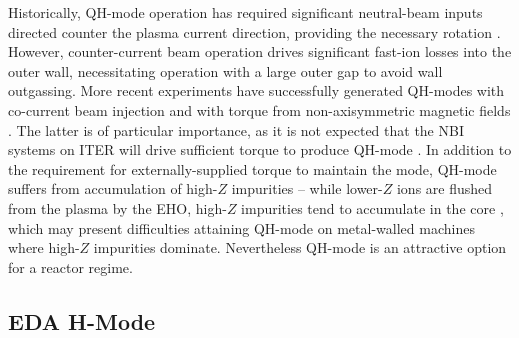 Historically, QH-mode operation has required significant neutral-beam inputs directed counter the plasma current direction, providing the necessary rotation \cite{Burrell2002}.  However, counter-current beam operation drives significant fast-ion losses into the outer wall, necessitating operation with a large outer gap to avoid wall outgassing.  More recent experiments have successfully generated QH-modes with co-current beam injection \cite{Burrell2009} and with torque from non-axisymmetric magnetic fields \cite{Garofalo2011,Burrell2013}.  The latter is of particular importance, as it is not expected that the NBI systems on ITER will drive sufficient torque to produce QH-mode \cite{Garofalo2011}.  In addition to the requirement for externally-supplied torque to maintain the mode, QH-mode suffers from accumulation of high-$Z$ impurities -- while lower-$Z$ ions are flushed from the plasma by the EHO, high-$Z$ impurities tend to accumulate in the core \cite{Doyle2001,Suttrop2005}, which may present difficulties attaining QH-mode on metal-walled machines where high-$Z$ impurities dominate.  Nevertheless QH-mode is an attractive option for a reactor regime.

\subsection{EDA H-Mode}\label{subsec:hcr_eda}

